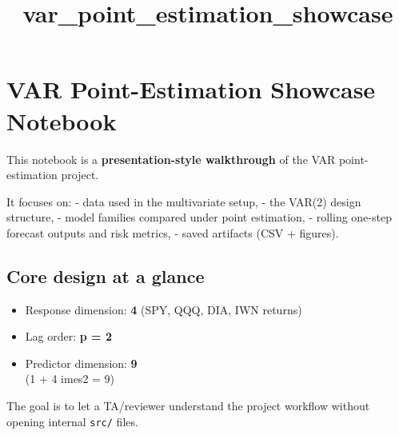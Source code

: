 \documentclass[11pt]{article}
\title{var\_point\_estimation\_showcase}
\providecommand{\tightlist}{%
      \setlength{\itemsep}{0pt}\setlength{\parskip}{0pt}}
\begin{document}
    
    \maketitle
    
    

    
    \section{VAR Point-Estimation Showcase
Notebook}\label{var-point-estimation-showcase-notebook}

This notebook is a \textbf{presentation-style walkthrough} of the VAR
point-estimation project.

It focuses on: - data used in the multivariate setup, - the VAR(2)
design structure, - model families compared under point estimation, -
rolling one-step forecast outputs and risk metrics, - saved artifacts
(CSV + figures).

\subsection{Core design at a glance}\label{core-design-at-a-glance}

\begin{itemize}
\tightlist
\item
  Response dimension: \textbf{4} (SPY, QQQ, DIA, IWN returns)
\item
  Lag order: \textbf{p = 2}
\item
  Predictor dimension: \textbf{9}\\
  (1 + 4 imes2 = 9)
\end{itemize}

The goal is to let a TA/reviewer understand the project workflow without
opening internal \texttt{src/} files.
\end{document}
